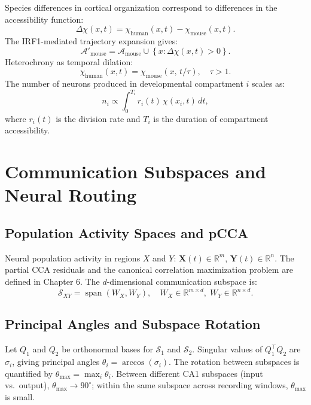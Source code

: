 \documentclass[12pt, a4paper, openany]{book}
\theoremstyle{definition}
\theoremstyle{remark}
\begin{document}
\begin{appendices}
Species differences in cortical organization correspond to differences in the accessibility function:
\begin{equation}
\Delta\chi(x,t) = \chi_{\text{human}}(x,t) - \chi_{\text{mouse}}(x,t).
\end{equation}
The IRF1-mediated trajectory expansion gives:
\begin{equation}
\mathcal{A}'_{\text{mouse}} = \mathcal{A}_{\text{mouse}} \cup \left\{x : \Delta\chi(x,t) > 0\right\}.
\end{equation}
Heterochrony as temporal dilation:
\begin{equation}
\chi_{\text{human}}(x,t) = \chi_{\text{mouse}}\!\left(x,\,t/\tau\right), \quad \tau > 1.
\end{equation}
The number of neurons produced in developmental compartment $i$ scales as:
\begin{equation}
n_i \propto \int_0^{T_i} r_i(t)\,\chi(x_i, t)\,dt,
\end{equation}
where $r_i(t)$ is the division rate and $T_i$ is the duration of compartment accessibility.

\chapter{Communication Subspaces and Neural Routing}

\section{Population Activity Spaces and pCCA}

Neural population activity in regions $X$ and $Y$: $\mathbf{X}(t) \in \mathbb{R}^m$, $\mathbf{Y}(t) \in \mathbb{R}^n$. The partial CCA residuals and the canonical correlation maximization problem are defined in Chapter 6. The $d$-dimensional communication subspace is:
\begin{equation}
\mathcal{S}_{XY} = \operatorname{span}(W_X, W_Y), \quad W_X \in \mathbb{R}^{m\times d},\; W_Y \in \mathbb{R}^{n\times d}.
\end{equation}

\section{Principal Angles and Subspace Rotation}

Let $Q_1$ and $Q_2$ be orthonormal bases for $\mathcal{S}_1$ and $\mathcal{S}_2$. Singular values of $Q_1^\top Q_2$ are $\sigma_i$, giving principal angles $\theta_i = \arccos(\sigma_i)$. The rotation between subspaces is quantified by $\theta_{\max} = \max_i \theta_i$. Between different CA1 subspaces (input vs.\ output), $\theta_{\max} \to 90^\circ$; within the same subspace across recording windows, $\theta_{\max}$ is small.


\end{appendices}
\end{document}
